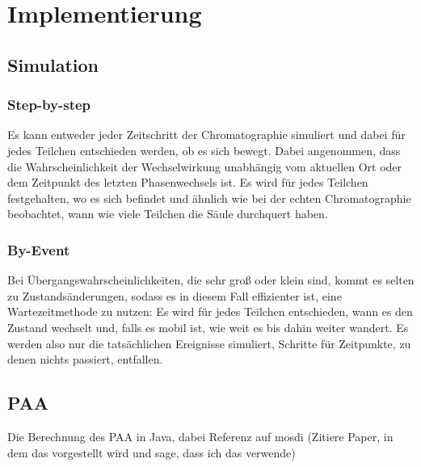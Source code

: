 
\chapter{Implementierung}
\label{chapter:imp}

\section{Simulation}

\subsection{Step-by-step}
Es kann entweder jeder Zeitschritt der Chromatographie simuliert und dabei für jedes Teilchen entschieden werden, ob es sich bewegt. Dabei angenommen, dass die Wahrscheinlichkeit der Wechselwirkung unabhängig vom aktuellen Ort oder dem Zeitpunkt des letzten Phasenwechsels ist. Es wird für jedes Teilchen festgehalten, wo es sich befindet und ähnlich wie bei der echten Chromatographie beobachtet, wann wie viele Teilchen die Säule durchquert haben. 

\subsection{By-Event}
Bei Übergangswahrscheinlichkeiten, die sehr groß oder klein sind, kommt es selten zu Zustandsänderungen, sodass es in diesem Fall effizienter ist, eine Wartezeitmethode zu nutzen: Es wird für jedes Teilchen entschieden, wann es den Zustand wechselt und, falls es mobil ist, wie weit es bis dahin weiter wandert. Es werden also nur die tatsächlichen Ereignisse simuliert, Schritte für Zeitpunkte, zu denen nichts passiert, entfallen.


\section{PAA}
Die Berechnung des PAA in Java, dabei Referenz auf mosdi (Zitiere Paper, in dem das vorgestellt wird und sage, dass ich das verwende)
